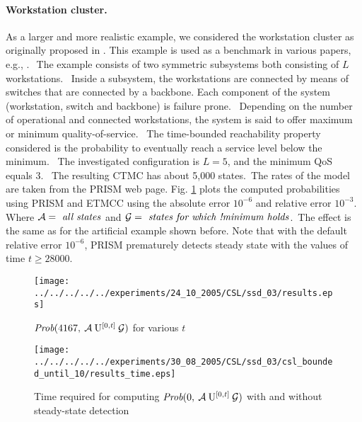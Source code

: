 \documentclass[times, 10pt,twocolumn]{article}
\begin{document}
	\paragraph{Workstation cluster. \label{ss:work_clust}}
		As a larger and more realistic example, we considered the workstation cluster as originally proposed in \cite{HaverkortHK_SRDS00}. This example is used as a benchmark in various papers, e.g., \cite{BuchholzKKT_JLAP03, YounesKNP_TACAS04, KwiatkowskaNP_IMTTCPE02, Prism_WC05}.$\:$ The example consists of two symmetric subsystems both consisting of $L$ workstations.  Inside a subsystem, the workstations are connected by means of switches that are connected by a backbone. Each component of the system (workstation, switch and backbone) is failure prone.  Depending on the number of operational and connected workstations, the system is said to offer maximum or minimum quality-of-service.  The time-bounded reachability property considered is the probability to eventually reach a service level below the minimum.  The investigated configuration is $L{=}5$, and the minimum QoS equals 3.  The resulting CTMC has about 5,000 states. The rates of the model are taken from the PRISM web page. Fig. \ref{gr:prob_5} plots the computed probabilities using PRISM and ETMCC using the absolute error $10^{{-}6}$ and relative error $10^{{-}3}$. Where $\mathcal{A} = \text{\emph{ all states}}$ and $\mathcal{G} = \text{\emph{ states for which !minimum holds}}$. The effect is the same as for the artificial example shown before.
		Note that with the default relative error $10^{{-}6}$, PRISM prematurely detects steady state with the values of time $t \geq 28000$.
		\begin{figure}
			\begin{center}
				\texttt{[image: ../../../../../experiments/24\_10\_2005/CSL/ssd\_03/results.eps]}
				\vspace{-0.4cm}
				\caption{{\small $\mbox{\it Prob}(4167, \: \mathcal{A} \: \mathrm{U}^{[0,t]} \: \mathcal{G} )$ for various $t$ \label{gr:prob_5}}}
			\end{center}
			\vspace{-0.8cm}
		\end{figure}
		\begin{figure}
			\begin{center}
				\texttt{[image: ../../../../../experiments/30\_08\_2005/CSL/ssd\_03/csl\_bounded\_until\_10/results\_time.eps]}
				\vspace{-0.4cm}
				\caption{{\small Time required for computing $\mbox{\it Prob}(0, \: \mathcal{A} \: \mathrm{U}^{[0,t]} \: \mathcal{G} )$ with and without steady-state detection \label{gr:prob_4}}}
			\end{center}
			\vspace{-0.8cm}
		\end{figure}
	
\end{document}
